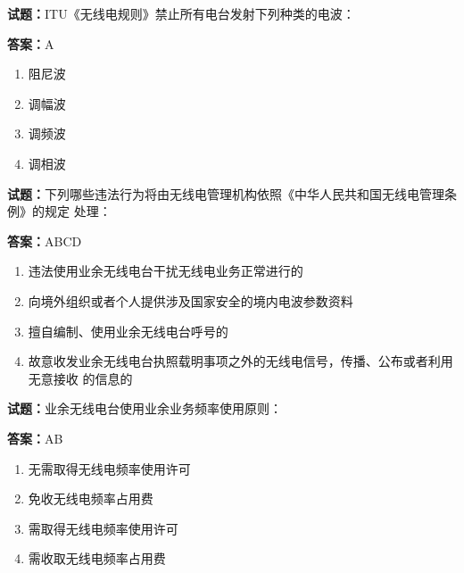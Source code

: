\documentclass{ctexbook}
\begin{document}
\vspace{1em}

\textbf{试题：}ITU《无线电规则》禁止所有电台发射下列种类的电波： 

\textbf{答案：}A 

\begin{enumerate}[leftmargin=3em]
  \item 阻尼波 

  \item 调幅波 

  \item 调频波 

  \item 调相波 

\end{enumerate}





\vspace{1em}

\textbf{试题：}下列哪些违法行为将由无线电管理机构依照《中华人民共和国无线电管理条例》的规定
处理： 

\textbf{答案：}ABCD 

\begin{enumerate}[leftmargin=3em]
  \item 违法使用业余无线电台干扰无线电业务正常进行的 

  \item 向境外组织或者个人提供涉及国家安全的境内电波参数资料 

  \item 擅自编制、使用业余无线电台呼号的 

  \item 故意收发业余无线电台执照载明事项之外的无线电信号，传播、公布或者利用无意接收
的信息的 

\end{enumerate}





\vspace{1em}

\textbf{试题：}业余无线电台使用业余业务频率使用原则： 

\textbf{答案：}AB 

\begin{enumerate}[leftmargin=3em]
  \item 无需取得无线电频率使用许可 

  \item 免收无线电频率占用费 

  \item 需取得无线电频率使用许可 

  \item 需收取无线电频率占用费 

\end{enumerate}
\end{document}
